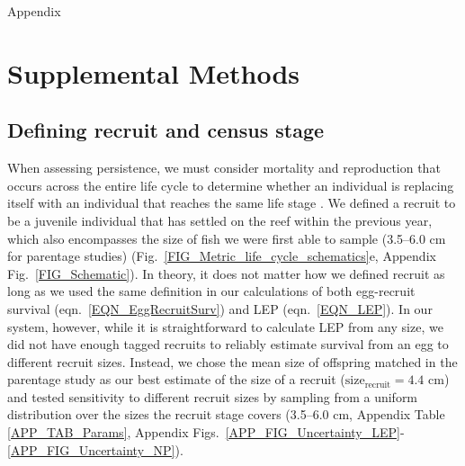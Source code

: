 \documentclass[12pt, oneside]{article}   	%
\begin{document}
{\LARGE Appendix}


\appendix

\renewcommand{\theequation}{A\arabic{equation}}
\renewcommand{\thetable}{A\arabic{table}}
\setcounter{equation}{0}  %
\setcounter{figure}{0}
\setcounter{table}{0}

\section{Supplemental Methods} \label{APP_SUPP_METHODS}

\subsection{Defining recruit and census stage} \label{APP_SEC_METHODS_Recruit_def}

When assessing persistence, we must consider mortality and reproduction that occurs across the entire life cycle to determine whether an individual is replacing itself with an individual that reaches the same life stage \citep{burgess2014beyond}. We defined a recruit to be a juvenile individual that has settled on the reef within the previous year, which also encompasses the size of fish we were first able to sample (3.5--6.0 cm for parentage studies) (Fig.\ \ref{FIG_Metric_life_cycle_schematics}e, Appendix Fig.\ \ref{FIG_Schematic}). In theory, it does not matter how we defined recruit as long as we used the same definition in our calculations of both egg-recruit survival (eqn.\ \ref{EQN_EggRecruitSurv}) and LEP (eqn.\ \ref{EQN_LEP}). In our system, however, while it is straightforward to calculate LEP from any size, we did not have enough tagged recruits to reliably estimate survival from an egg to different recruit sizes. Instead, we chose the mean size of offspring matched in the parentage study as our best estimate of the size of a recruit ($\text{size}_\text{recruit} = 4.4$ cm) and tested sensitivity to different recruit sizes by sampling from a uniform distribution over the sizes the recruit stage covers (3.5--6.0 cm, Appendix Table \ref{APP_TAB_Params}, Appendix Figs.\ \ref{APP_FIG_Uncertainty_LEP}-\ref{APP_FIG_Uncertainty_NP}).
\end{document}
